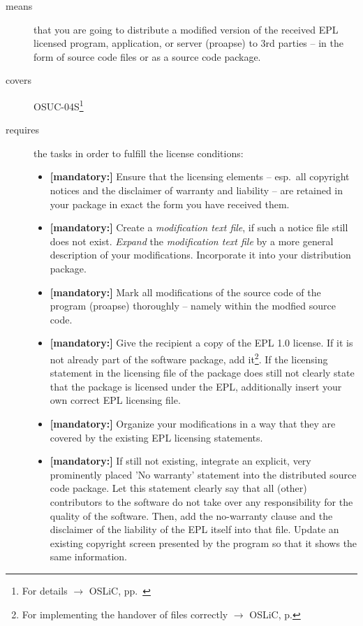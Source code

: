 \begin{description}
\item[means] that you are going to distribute a modified version of the received
EPL licensed program, application, or server (proapse) to 3rd parties -- in the
form of source code files or as a source code package.
\item[covers] OSUC-04S\footnote{For details $\rightarrow$ OSLiC, pp.\
\pageref{OSUC-04S-DEF}}
\item[requires] the tasks in order to fulfill the license conditions:
\begin{itemize}
  
  \item \textbf{[mandatory:]} Ensure that the licensing elements -- esp.\ all
  copyright notices and the disclaimer of warranty and liability -- are retained
  in your package in exact the form you have received them.
  
  \item \textbf{[mandatory:]} Create a \emph{modification text file}, if such a
  notice file still does not exist. \emph{Expand} the \emph{modification text
  file} by a more general description of your modifications. Incorporate it into
  your distribution package.
  
  \item \textbf{[mandatory:]} Mark all modifications of the source code of the
  program (proapse) thoroughly -- namely within the
  modfied source code.
  
  \item \textbf{[mandatory:]} Give the recipient a copy of the EPL 1.0 license.
  If it is not already part of the software package, add it\footnote{For
  implementing the handover of files correctly $\rightarrow$ OSLiC, p.
  \pageref{DistributingFilesHint}}. If the licensing statement in the licensing
  file of the package does still not clearly state that the package is licensed
  under the EPL, additionally insert your own correct EPL licensing file.

  \item \textbf{[mandatory:]} Organize your modifications in a way that they are
  covered by the existing EPL licensing statements.
  
  \item \textbf{[mandatory:]} If still not existing, integrate an explicit, very
  prominently placed 'No warranty' statement into the distributed source code
  package. Let this statement clearly say that all (other) contributors to the
  software do not take over any responsibility for the quality of the software.
  Then, add the no-warranty clause and the disclaimer of the liability of the
  EPL itself into that file. Update an existing copyright screen presented by
  the program so that it shows the same information.


\end{itemize}
\end{description}
